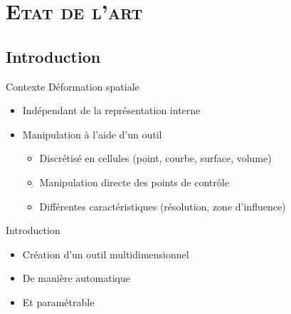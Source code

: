 \documentclass[xcolor=x11names,compress]{beamer}
\renewcommand{\(}{\begin{columns}} \renewcommand{\)}{\end{columns}}
\newcommand{\<}[1]{\begin{column}{#1}} \renewcommand{\>}{\end{column}}
\begin{document}
\section{\scshape Etat de l'art}
\subsection{Introduction}

\begin{frame}{Contexte}
  Déformation spatiale
  \begin{itemize}
  \item Indépendant de la représentation interne
  \item Manipulation à l'aide d'un outil
    \begin{itemize}
    \item Discrétisé en cellules (point, courbe, surface, volume)
    \item Manipulation directe des points de contrôle
    \item Différentes caractéristiques (résolution, zone d'influence)
    \end{itemize}
  \end{itemize}
\end{frame}

\begin{frame}{Introduction}
  \begin{itemize}
  \item Création d'un outil multidimensionnel
  \item De manière automatique
  \item Et paramétrable
  \end{itemize}
\end{frame}
\end{document}
